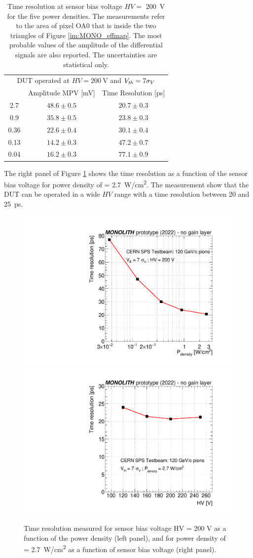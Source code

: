 		\begin{table}[h]
			\centering
			\renewcommand{\arraystretch}{1.2}
			\begin{tabular}{|c|c|c|}
			\cline{1-3}
			\multicolumn{3}{|c|}{DUT operated at  $ HV = \SI{200}{\volt} $ and $V_{\it th} = 7 \sigma_V$} \\ 
			\cline{1-3}
			~~\power [W/cm$^2$]~~ & Amplitude MPV [mV] & Time Resolution [ps] \\
			\cline{1-3}
			2.7   & $ 48.6 \pm 0.5 $ &   $20.7 \pm 0.3$ \\
			0.9   & $ 35.8 \pm 0.5 $ &   $23.8 \pm 0.3$ \\
			0.36  & $ 22.6 \pm 0.4 $ &   $30.1 \pm 0.4$ \\
			0.13  & $ 14.2 \pm 0.3 $ &   $47.2 \pm 0.7$ \\
			0.04  & $ 16.2 \pm 0.3 $ &   $77.1 \pm 0.9$ \\
			\cline{1-3}
			\end{tabular}
			\caption{ Time resolution at sensor bias voltage $HV =$ \SI{200}{\volt} for the five power densities. The measurements refer to the area of pixel OA0 that is inside the two triangles of Figure \ref{im:MONO_effmap}. The most probable values of the amplitude of the differential signals are also reported. The uncertainties are statistical only.}
			\label{tab:MONO_tabsumm} 
		\end{table}

		The right panel of Figure \ref{im:MONO_TOF_power_HV} shows the time resolution as a function of the sensor bias voltage for power density of \power = \SI{2.7}{\watt/\centi\meter^2}. The measurement show that the DUT can be operated in a wide $HV$ range with a time resolution between 20 and \SI{25}{\pico\second}.


		\begin{figure}[h]
			\centering %
			\includegraphics[width=.49\linewidth]{files/MONOLITH_paper/timeres_vs_power.pdf}
			\includegraphics[width=.49\linewidth]{files/MONOLITH_paper/timeres_vs_HV.pdf}
			\caption{Time resolution measured for sensor bias voltage HV = 200 V as a function of the power density (left panel), and for power density of \power = \SI{2.7}{\watt/\centi\meter^2} as a function of sensor bias voltage (right panel).}
			\label{im:MONO_TOF_power_HV} 
		\end{figure}

